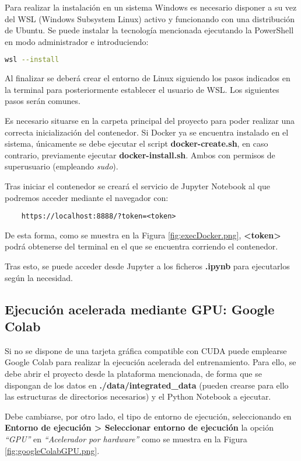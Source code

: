 Para realizar la instalación en un sistema Windows es necesario disponer a su vez del WSL (Windows Subsystem Linux) activo y funcionando con una distribución
de Ubuntu.
Se puede instalar la tecnología mencionada ejecutando la PowerShell en modo administrador e introduciendo:
\begin{lstlisting}[language=Bash]
    wsl --install
\end{lstlisting}

Al finalizar se deberá crear el entorno de Linux siguiendo los pasos indicados en la terminal para posteriormente establecer el usuario
de WSL.
Los siguientes pasos serán comunes.

Es necesario situarse en la carpeta principal del proyecto para poder realizar una correcta inicialización del contenedor. 
Si Docker ya se encuentra instalado en el sistema, únicamente se debe ejecutar el script \textbf{docker-create.sh}, en caso contrario,
previamente ejecutar \textbf{docker-install.sh}. Ambos con permisos de superusuario (empleando \textit{sudo}).

Tras iniciar el contenedor se creará el servicio de Jupyter Notebook al que podremos acceder mediante el navegador con:
\begin{lstlisting}
    https://localhost:8888/?token=<token>
\end{lstlisting} 

De esta forma, como se muestra en la Figura \ref{fig:execDocker.png}, \textbf{<token>} podrá obtenerse del terminal en el que se encuentra corriendo
el contenedor.


Tras esto, se puede acceder desde Jupyter a los ficheros \textbf{.ipynb} para ejecutarlos según la necesidad.

\subsection{Ejecución acelerada mediante GPU: Google Colab}
Si no se dispone de una tarjeta gráfica compatible con CUDA puede emplearse Google Colab para realizar la ejecución acelerada del entrenamiento.
Para ello, se debe abrir el proyecto desde la plataforma mencionada, de forma que se dispongan de los datos en \textbf{./data/integrated\_data} 
(pueden crearse para ello las estructuras de directorios necesarios) y el Python Notebook a ejecutar.

Debe cambiarse, por otro lado, el tipo de entorno de ejecución, seleccionando en \textbf{Entorno de ejecución > Seleccionar entorno de ejecución}
la opción \textit{``GPU''} en \textit{``Acelerador por hardware''} como se muestra en la Figura \ref{fig:googleColabGPU.png}.

